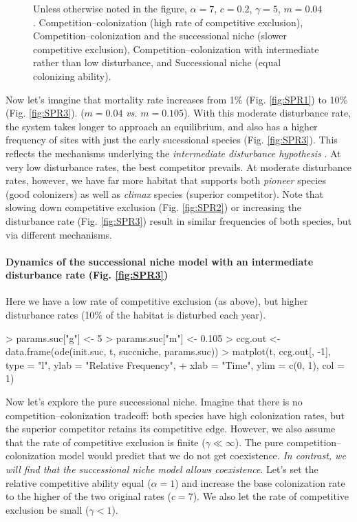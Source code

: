 \begin{figure}[ht]
  \caption[Dynamics of a successional community]{Unless otherwise noted in the figure, $\alpha=7$, $c=0.2$, $\gamma=5$, $m=0.04$.  Competition--colonization (high rate of competitive exclusion),   Competition--colonization and the successional niche (slower competitive exclusion),   Competition--colonization with intermediate rather than low disturbance, and  Successional niche (equal colonizing ability).}
\end{figure}

Now let's imagine that mortality rate increases from 1\% (Fig. \ref{fig:SPR1}) to 10\% (Fig. \ref{fig:SPR3}). ($m=0.04$ \emph{vs.} $m=0.105$). With this moderate disturbance rate, the system takes longer to approach an equilibrium, and also has a higher frequency of sites with just the early sucessional species (Fig. \ref{fig:SPR3}). This reflects the mechanisms underlying the \emph{intermediate disturbance hypothesis} \cite{Connell1978}. At very low disturbance rates, the best competitor prevails. At moderate disturbance rates, however, we have far more habitat that supports both \emph{pioneer} species (good colonizers) as well as \emph{climax} species (superior competitor). Note that slowing down competitive exclusion (Fig. \ref{fig:SPR2}) or increasing the disturbance rate (Fig. \ref{fig:SPR3}) result in similar frequencies of both species, but via different mechanisms.

\medskip \noindent
\begin{boxedminipage}{\linewidth}
  {\footnotesize
\paragraph{Dynamics of the successional niche model with an intermediate disturbance rate (Fig. \ref{fig:SPR3})}
Here we have a low rate of competitive exclusion (as above), but higher disturbance rates (10\% of the habitat is disturbed each year).
\begin{Schunk}
\begin{Sinput}
> params.suc["g"] <- 5
> params.suc["m"] <- 0.105
> ccg.out <- data.frame(ode(init.suc, t, succniche, params.suc))
> matplot(t, ccg.out[, -1], type = "l", ylab = "Relative Frequency", 
+     xlab = "Time", ylim = c(0, 1), col = 1)
\end{Sinput}
\end{Schunk}
}
\end{boxedminipage} \medskip

Now let's explore the pure successional niche. Imagine that there is no competition--colonization tradeoff: both species have high colonization rates, but the superior competitor retains its competitive edge. However, we also assume that the rate of competitive exclusion is finite ($\gamma \ll \infty$). The pure competition--colonization model would predict that we do not get coexistence. \emph{In contrast, we will find that the successional niche model allows coexistence}. Let's set the relative competitive ability equal ($\alpha=1$) and increase the base colonization rate to the higher of the two original rates ($c=7$). We also let the rate of competitive exclusion be small ($\gamma < 1$). 

